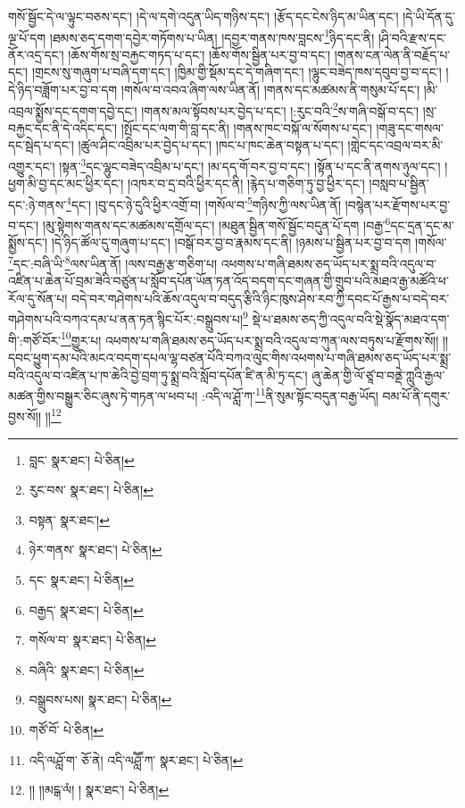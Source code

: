 གསོ་སྦྱོང་དེ་ལ་ལྟུང་བཅས་དང་། །དེ་ལ་དགེ་འདུན་ཡིད་གཉིས་དང་། །རྩོད་དང་ངེས་ཉིད་མ་ཡིན་དང་། །དེ་ཡི་དོན་དུ་ལྔ་པོ་དག །ཐམས་ཅད་དགག་དབྱེར་གཏོགས་པ་ཡིན། །དབྱར་གནས་ཁས་བླངས་\footnote{བླང་  སྣར་ཐང་།  པེ་ཅིན། }ཉིད་དང་ནི། །ཤི་བའི་རྫས་དང་ནོར་འདྲ་དང་། །ཆོས་གོས་སྲ་བརྐྱང་གཏད་པ་དང་། །ཆོས་གོས་སྦྱིན་པར་བྱ་བ་དང་། །གནས་ངན་ལེན་ནི་བརྗོད་པ་དང་། །གྲངས་སུ་གཞུག་པ་བཞི་དག་དང་། །ཁྱིམ་གྱི་སྡོམ་དང་དེ་གཞིག་དང་། །ལྷུང་བཟེད་ཁས་དབུབ་བྱ་བ་དང་། །དེ་ཉིད་བཟློག་པར་བྱ་བ་དག །གསོལ་བ་འབའ་ཞིག་ལས་ཡིན་ནོ། །གནས་དང་མཚམས་ནི་གསུམ་པོ་དང་། །མི་འབྲལ་སྨྱོས་དང་དགག་དབྱེ་དང་། །གནས་མལ་སྟོབས་པར་བྱེད་པ་དང་། །:རུང་བའི་\footnote{རུང་བས་  སྣར་ཐང་།  པེ་ཅིན། }ས་གཞི་བསྒོ་བ་དང་། །སྲ་བརྐྱང་དང་ནི་དེ་འདིང་དང་། །སྤོང་དང་ལག་གི་བླ་དང་ནི། །གནས་ཁང་བསྐོ་ལ་སོགས་པ་དང་། །གཟུ་དང་གསལ་དང་སྦེད་པ་དང་། །ཚུལ་ཤིང་འབྲིམ་པར་བྱེད་པ་དང་། །ཁང་པ་ཁང་ཆེན་བསྟན་པ་དང་། །གླེང་དང་འབྲལ་བར་མི་འགྱུར་དང་། །སྟན་\footnote{བསྟན་  སྣར་ཐང་། }དང་ལྷུང་བཟེད་འབྲིམ་པ་དང་། །མ་དད་གོ་བར་བྱ་བ་དང་། །སྟོན་པ་དང་ནི་ནགས་ཉུལ་དང་། །ཕྱག་མི་བྱ་དང་མང་ཕྱིར་དང་། །འཁར་བ་དྲ་བའི་ཕྱིར་དང་ནི། །རྙེད་པ་གཅིག་ཏུ་བྱ་ཕྱིར་དང་། །བསླབ་པ་སྦྱིན་དང་:ཉེ་གནས་\footnote{ཉེར་གནས་  སྣར་ཐང་།  པེ་ཅིན། }དང་། །བུ་དང་ཉེ་དུའི་ཕྱིར་འགྲོ་བ། །གསོལ་བ་\footnote{དང་  སྣར་ཐང་།  པེ་ཅིན། }གཉིས་ཀྱི་ལས་ཡིན་ནོ། །བསྙེན་པར་རྫོགས་པར་བྱ་བ་དང་། །མུ་སྟེགས་གནས་དང་མཚམས་དགྲོལ་དང་། །མཐུན་སྦྱིན་གསོ་སྦྱོང་བདུན་པོ་དག །བརྒྱ་\footnote{བརྒྱད་  སྣར་ཐང་།  པེ་ཅིན། }དང་དྲན་དང་མ་སྨྱོས་དང་། །དེ་ཉིད་ཚོལ་དུ་གཞུག་པ་དང་། །བསྒོ་བར་བྱ་བ་རྣམས་དང་ནི། །ཉམས་པ་སྦྱིན་པར་བྱ་བ་དག །གསོལ་\footnote{གསོལ་བ་  སྣར་ཐང་།  པེ་ཅིན། }དང་:བཞི་ཡི་\footnote{བཞིའི་  སྣར་ཐང་།  པེ་ཅིན། }ལས་ཡིན་ནོ། །ལས་བརྒྱ་རྩ་གཅིག་པ། འཕགས་པ་གཞི་ཐམས་ཅད་ཡོད་པར་སྨྲ་བའི་འདུལ་བ་འཛིན་པ་ཆེན་པོ་བྲམ་ཟེའི་བཙུན་པ་སློབ་དཔོན་ཡོན་ཏན་འོད་བདག་དང་གཞན་གྱི་གྲུབ་པའི་མཐའ་རྒྱ་མཚོའི་ཕ་རོལ་དུ་སོན་པ། བདེ་བར་གཤེགས་པའི་ཆོས་འདུལ་བ་བདུད་རྩིའི་ཉིང་ཁུས་ཤེས་རབ་ཀྱི་དབང་པོ་རྒྱས་པ་བདེ་བར་གཤེགས་པའི་བཀའ་དམ་པ་ནན་ཏན་སྙིང་པོར་:བསྒྲུབས་པ།\footnote{བསྒྲུབས་པས།  སྣར་ཐང་།  པེ་ཅིན། } སྡེ་པ་ཐམས་ཅད་ཀྱི་འདུལ་བའི་སྡེ་སྣོད་མཐའ་དག་གི་:གཙོ་བོར་\footnote{གཙོ་བོ་  པེ་ཅིན། }གྱུར་པ། འཕགས་པ་གཞི་ཐམས་ཅད་ཡོད་པར་སྨྲ་བའི་འདུལ་བ་ཀུན་ལས་བཏུས་པ་རྫོགས་སོ།། །།དབང་ཕྱུག་དམ་པའི་མངའ་བདག་དཔལ་ལྷ་བཙན་པོའི་བཀའ་ལུང་གིས་འཕགས་པ་གཞི་ཐམས་ཅད་ཡོད་པར་སྨྲ་བའི་འདུལ་བ་འཛིན་པ་ཁ་ཆེའི་བྱེ་བྲག་ཏུ་སྨྲ་བའི་སློབ་དཔོན་ཛི་ན་མི་ཏྲ་དང་། ཞུ་ཆེན་གྱི་ལོ་ཙཱ་བ་བནྡེ་ཀླུའི་རྒྱལ་མཚན་གྱིས་བསྒྱུར་ཅིང་ཞུས་ཏེ་གཏན་ལ་ཕབ་པ། :འདི་ལ་ཤློ་ཀ་\footnote{འདི་ལཤློ་ག་  ཅོ་ནེ། འདི་ལཤླཽ་ཀ་  སྣར་ཐང་།  པེ་ཅིན། }ནི་སུམ་སྟོང་བདུན་བརྒྱ་ཡོད། བམ་པོ་ནི་དགུར་བྱས་སོ།། །།\footnote{།། །།མངྒ་ལཾ། །  སྣར་ཐང་།  པེ་ཅིན། }